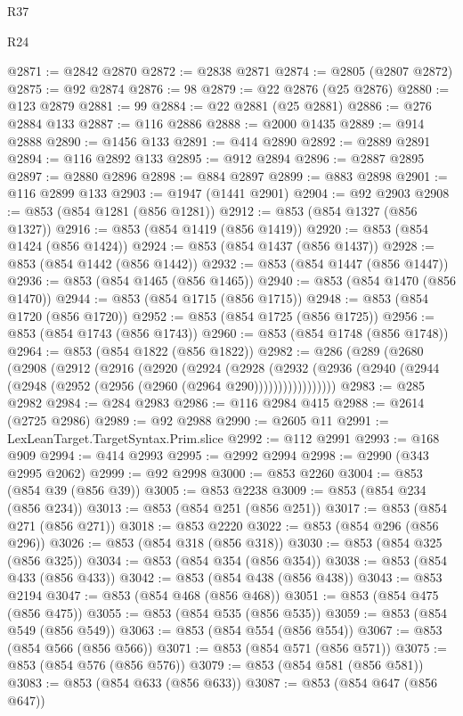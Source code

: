 \begin{lexlean}{R37}
\begin{lexlean}{R24}
\begin{coremodule}
{{{{{{{{{{{{{{{{{{{{{{{{{{{{{{{{{{{{{{{{{{{{{{{{{{{{{{{{{{{{{{{{{{{{{{{{{{{{{{{{{{{{{{{{{{{{{{{{{{{{{{{{{{{{{{{{{{{{{{{{{{{{{{{{{{{{{{{{{{{{{{{{{{{{{{{{{{{{{{{{{{{{{{{{{{{{{{{{{{{{{{{{{@2871 := @2842 @2870
@2872 := @2838 @2871
@2874 := @2805 (@2807 @2872)
@2875 := @92 @2874
@2876 := 98
@2879 := @22 @2876 (@25 @2876)
@2880 := @123 @2879
@2881 := 99
@2884 := @22 @2881 (@25 @2881)
@2886 := @276 @2884 @133
@2887 := @116 @2886
@2888 := @2000 @1435
@2889 := @914 @2888
@2890 := @1456 @133
@2891 := @414 @2890
@2892 := @2889 @2891
@2894 := @116 @2892 @133
@2895 := @912 @2894
@2896 := @2887 @2895
@2897 := @2880 @2896
@2898 := @884 @2897
@2899 := @883 @2898
@2901 := @116 @2899 @133
@2903 := @1947 (@1441 @2901)
@2904 := @92 @2903
@2908 := @853 (@854 @1281 (@856 @1281))
@2912 := @853 (@854 @1327 (@856 @1327))
@2916 := @853 (@854 @1419 (@856 @1419))
@2920 := @853 (@854 @1424 (@856 @1424))
@2924 := @853 (@854 @1437 (@856 @1437))
@2928 := @853 (@854 @1442 (@856 @1442))
@2932 := @853 (@854 @1447 (@856 @1447))
@2936 := @853 (@854 @1465 (@856 @1465))
@2940 := @853 (@854 @1470 (@856 @1470))
@2944 := @853 (@854 @1715 (@856 @1715))
@2948 := @853 (@854 @1720 (@856 @1720))
@2952 := @853 (@854 @1725 (@856 @1725))
@2956 := @853 (@854 @1743 (@856 @1743))
@2960 := @853 (@854 @1748 (@856 @1748))
@2964 := @853 (@854 @1822 (@856 @1822))
@2982 := @286
    (@289
      (@2680
        (@2908
          (@2912
            (@2916
              (@2920
                (@2924
                  (@2928
                    (@2932
                      (@2936 (@2940 (@2944 (@2948 (@2952 (@2956 (@2960 (@2964 @290)))))))))))))))))
@2983 := @285 @2982
@2984 := @284 @2983
@2986 := @116 @2984 @415
@2988 := @2614 (@2725 @2986)
@2989 := @92 @2988
@2990 := @2605 @11
@2991 := LexLeanTarget.TargetSyntax.Prim.slice
@2992 := @112 @2991
@2993 := @168 @909
@2994 := @414 @2993
@2995 := @2992 @2994
@2998 := @2990 (@343 @2995 @2062)
@2999 := @92 @2998
@3000 := @853 @2260
@3004 := @853 (@854 @39 (@856 @39))
@3005 := @853 @2238
@3009 := @853 (@854 @234 (@856 @234))
@3013 := @853 (@854 @251 (@856 @251))
@3017 := @853 (@854 @271 (@856 @271))
@3018 := @853 @2220
@3022 := @853 (@854 @296 (@856 @296))
@3026 := @853 (@854 @318 (@856 @318))
@3030 := @853 (@854 @325 (@856 @325))
@3034 := @853 (@854 @354 (@856 @354))
@3038 := @853 (@854 @433 (@856 @433))
@3042 := @853 (@854 @438 (@856 @438))
@3043 := @853 @2194
@3047 := @853 (@854 @468 (@856 @468))
@3051 := @853 (@854 @475 (@856 @475))
@3055 := @853 (@854 @535 (@856 @535))
@3059 := @853 (@854 @549 (@856 @549))
@3063 := @853 (@854 @554 (@856 @554))
@3067 := @853 (@854 @566 (@856 @566))
@3071 := @853 (@854 @571 (@856 @571))
@3075 := @853 (@854 @576 (@856 @576))
@3079 := @853 (@854 @581 (@856 @581))
@3083 := @853 (@854 @633 (@856 @633))
@3087 := @853 (@854 @647 (@856 @647))
}}}}}}}}}}}}}}}}}}}}}}}}}}}}}}}}}}}}}}}}}}}}}}}}}}}}}}}}}}}}}}}}}}}}}}}}}}}}}}}}}}}}}}}}}}}}}}}}}}}}}}}}}}}}}}}}}}}}}}}}}}}}}}}}}}}}}}}}}}}}}}}}}}}}}}}}}}}}}}}}}}}}}}}}}}}}}}}}}}}}}}}}}
\end{coremodule}
\end{lexlean}
\end{lexlean}

